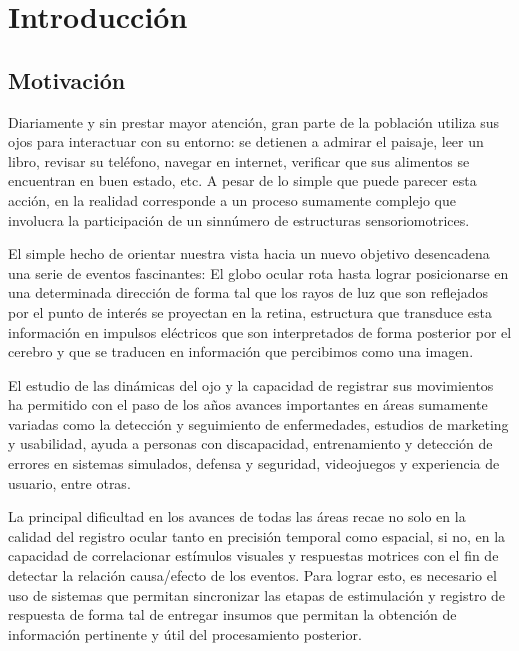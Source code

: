 \documentclass[../main.tex]{subfiles}
\begin{document}
		
\chapter{Introducción}
\label{cha:01_introducción}
	\section{Motivación}
	\label{sec:01_motivacion}
		Diariamente y sin prestar mayor atención, gran parte de la población utiliza sus ojos para interactuar con su entorno: se detienen a admirar el paisaje, leer un libro, revisar su teléfono, navegar en internet, verificar que sus alimentos se encuentran en buen estado, etc. A pesar de lo simple que puede parecer esta acción, en la realidad corresponde a un proceso sumamente complejo que involucra la participación de un sinnúmero de estructuras sensoriomotrices. 

		El simple hecho de orientar nuestra vista hacia un nuevo objetivo desencadena una serie de eventos fascinantes: El globo ocular rota hasta lograr posicionarse en una determinada dirección de forma tal que los rayos de luz que son reflejados por el punto de interés se proyectan en la \gls{retina}, estructura que transduce esta información en impulsos eléctricos que son interpretados de forma posterior por el cerebro y que se traducen en información que percibimos como una imagen.  

		El estudio de las dinámicas del ojo y la capacidad de registrar sus movimientos ha permitido con el paso de los años avances importantes en áreas sumamente variadas como la detección y seguimiento de enfermedades, estudios de marketing y usabilidad, ayuda a personas con discapacidad, entrenamiento y detección de errores en sistemas simulados, defensa y seguridad, videojuegos y experiencia de usuario, entre otras.

		La principal dificultad en los avances de todas las áreas recae no solo en la calidad del registro ocular tanto en precisión temporal como espacial, si no, en la capacidad de correlacionar estímulos visuales y respuestas motrices con el fin de detectar la relación causa/efecto de los eventos. Para lograr esto, es necesario el uso de sistemas que permitan sincronizar las etapas de estimulación y registro de respuesta de forma tal de entregar insumos que permitan la obtención de información pertinente y útil del procesamiento posterior.  
\end{document}
